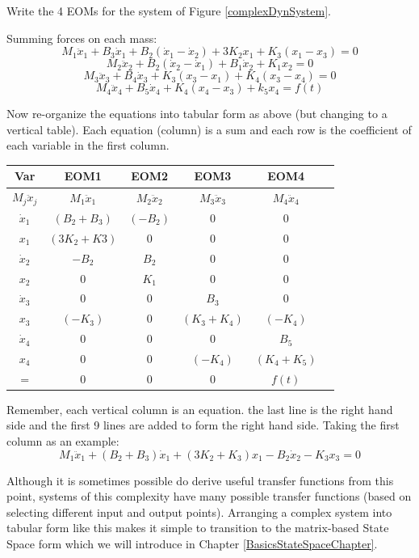 \begin{Example}
  Write the 4 EOMs for the system of Figure \ref{complexDynSystem}.

Summing forces on each mass:
\[
M_1\ddot{x}_1 + B_3\dot{x}_1+B_2(\dot{x}_1-\dot{x}_2) +3K_2x_1+K_3(x_1-x_3)  = 0
\]
\[
M_2\ddot{x}_2 + B_2(\dot{x}_2-\dot{x}_1)+B_1\dot{x}_2+K_1x_2 = 0
\]
\[
M_3\ddot{x}_3 + B_4\dot{x}_3+K_3(x_3-x_1)+K_4(x_3-x_4)=0
\]
\[
M_4\ddot{x}_4+B_5\dot{x}_4+K_4(x_4-x_3)+k_5x_4 = f(t)
\]


Now re-organize the equations into tabular form as above (but changing to a vertical table).   Each equation (column) is a sum and each row is the coefficient of
each variable in the first column.

\begin{tabular}{|c|c|c|c|c|c|}\hline
  Var           & EOM1 & EOM2 & EOM3 & EOM4\\\hline
  $M_j\ddot{x}_j$  & $M_1\ddot{x}_1$&$M_2\ddot{x}_2$&$M_3\ddot{x}_3$ &$M_4\ddot{x}_4$ \\ \hline
  $\dot{x}_1$   & $(B_2+B_3)$ &$(-B_2)$  & 0           & 0 \\ \hline
        $x_1$   & $(3K_2+K3)$ &0         & 0           & 0 \\ \hline
  $\dot{x}_2$   & $-B_2$      & $B_2$    & 0           & 0 \\ \hline
        $x_2$   & 0           & $K_1$    & 0           & 0 \\ \hline
  $\dot{x}_3$   & 0           & 0        & $B_3$       & 0 \\ \hline
        $x_3$   & $(-K_3)$    & 0        & $(K_3+K_4)$ & $(-K_4)$ \\ \hline
  $\dot{x}_4$   & 0           & 0        & 0           & $B_5$    \\ \hline
        $x_4$   & 0           & 0        & $(-K_4)$    & $(K_4+K_5)$ \\ \hline\hline
        =       & 0  & 0  & 0 & $f(t)$ \\ \hline
\end{tabular}


Remember, each vertical column is an equation.  the last line is the right
hand side and the first 9 lines are added to form the right hand side.
Taking the first column as an example:
\[
M_1\ddot{x}_1+(B_2+B_3)\dot{x}_1+(3K_2+K_3)x_1-B_2\dot{x}_2 -K_3x_3 = 0
\]

\end{Example}

Although it is sometimes possible do derive useful transfer functions from
this point, systems of this complexity have many possible transfer functions
(based on selecting different input and output points).
Arranging a complex
system into tabular form like this makes it simple to transition to
the matrix-based State Space form which we will introduce in Chapter
\ref{BasicsStateSpaceChapter}.

